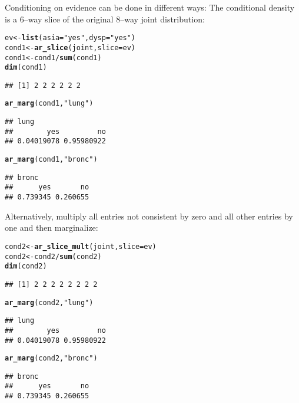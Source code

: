 \documentclass[10pt]{article}\usepackage[]{graphicx}\usepackage[]{color}
\makeatletter
\newcommand{\hlstr}[1]{\textcolor[rgb]{0.192,0.494,0.8}{#1}}%
\newcommand{\hlopt}[1]{\textcolor[rgb]{0,0,0}{#1}}%
\newcommand{\hlstd}[1]{\textcolor[rgb]{0.345,0.345,0.345}{#1}}%
\newcommand{\hlkwb}[1]{\textcolor[rgb]{0.69,0.353,0.396}{#1}}%
\newcommand{\hlkwc}[1]{\textcolor[rgb]{0.333,0.667,0.333}{#1}}%
\newcommand{\hlkwd}[1]{\textcolor[rgb]{0.737,0.353,0.396}{\textbf{#1}}}%
\newenvironment{kframe}{%
 \def\at@end@of@kframe{}%
 \ifinner\ifhmode%
  \def\at@end@of@kframe{\end{minipage}}%
  \begin{minipage}{\columnwidth}%
 \fi\fi%
 \def\FrameCommand##1{\hskip\@totalleftmargin \hskip-\fboxsep
 \colorbox{shadecolor}{##1}\hskip-\fboxsep
     \hskip-\linewidth \hskip-\@totalleftmargin \hskip\columnwidth}%
 \MakeFramed {\advance\hsize-\width
   \@totalleftmargin\z@ \linewidth\hsize
   \@setminipage}}%
 {\par\unskip\endMakeFramed%
 \at@end@of@kframe}
\newenvironment{knitrout}{}{} %
\makeatother
\begin{document}
Conditioning on evidence can be done in different ways: The conditional density is a $6$--way slice of the original $8$--way joint distribution:
\begin{knitrout}
\color{fgcolor}\begin{kframe}
\begin{alltt}
\hlstd{ev} \hlkwb{<-} \hlkwd{list}\hlstd{(}\hlkwc{asia}\hlstd{=}\hlstr{"yes"}\hlstd{,} \hlkwc{dysp}\hlstd{=}\hlstr{"yes"}\hlstd{)}
\hlstd{cond1} \hlkwb{<-} \hlkwd{ar_slice}\hlstd{(joint,} \hlkwc{slice}\hlstd{=ev)}
\hlstd{cond1} \hlkwb{<-} \hlstd{cond1} \hlopt{/} \hlkwd{sum}\hlstd{(cond1)}
\hlkwd{dim}\hlstd{(cond1)}
\end{alltt}
\begin{verbatim}
## [1] 2 2 2 2 2 2
\end{verbatim}
\begin{alltt}
\hlkwd{ar_marg}\hlstd{(cond1,} \hlstr{"lung"}\hlstd{)}
\end{alltt}
\begin{verbatim}
## lung
##        yes         no 
## 0.04019078 0.95980922
\end{verbatim}
\begin{alltt}
\hlkwd{ar_marg}\hlstd{(cond1,} \hlstr{"bronc"}\hlstd{)}
\end{alltt}
\begin{verbatim}
## bronc
##      yes       no 
## 0.739345 0.260655
\end{verbatim}
\end{kframe}
\end{knitrout}

Alternatively, multiply all entries not consistent by zero and all other entries by one and then marginalize:
\begin{knitrout}
\color{fgcolor}\begin{kframe}
\begin{alltt}
\hlstd{cond2} \hlkwb{<-} \hlkwd{ar_slice_mult}\hlstd{(joint,} \hlkwc{slice}\hlstd{=ev)}
\hlstd{cond2} \hlkwb{<-} \hlstd{cond2} \hlopt{/} \hlkwd{sum}\hlstd{(cond2)}
\hlkwd{dim}\hlstd{(cond2)}
\end{alltt}
\begin{verbatim}
## [1] 2 2 2 2 2 2 2 2
\end{verbatim}
\begin{alltt}
\hlkwd{ar_marg}\hlstd{(cond2,} \hlstr{"lung"}\hlstd{)}
\end{alltt}
\begin{verbatim}
## lung
##        yes         no 
## 0.04019078 0.95980922
\end{verbatim}
\begin{alltt}
\hlkwd{ar_marg}\hlstd{(cond2,} \hlstr{"bronc"}\hlstd{)}
\end{alltt}
\begin{verbatim}
## bronc
##      yes       no 
## 0.739345 0.260655
\end{verbatim}
\end{kframe}
\end{knitrout}
\end{document}
